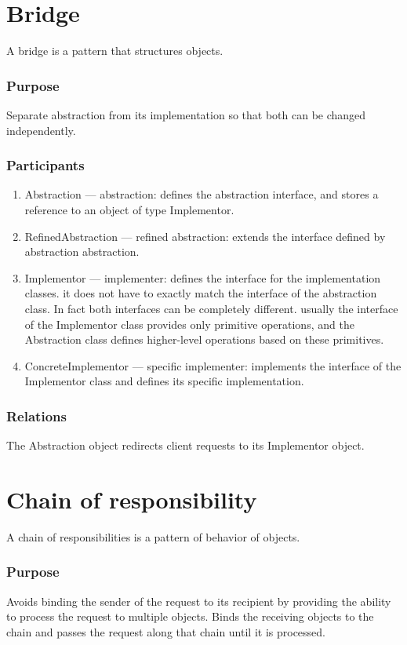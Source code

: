 \documentclass[12pt]{book}
\begin{document}
\section{Bridge}
A bridge is a pattern that structures objects.

\subsubsection{Purpose}
Separate abstraction from its implementation so that both can be changed independently.

\subsubsection{Participants}
\begin{enumerate}
    \item Abstraction — abstraction: defines the abstraction interface, and stores a reference to an object of type Implementor.
    \item RefinedAbstraction —  refined abstraction: extends the interface defined by abstraction abstraction.
    \item Implementor — implementer: defines the interface for the implementation classes. it does not have to exactly match the interface of the abstraction class. In fact both interfaces can be completely different. usually the interface of the Implementor class provides only primitive operations, and the  Abstraction class defines higher-level operations based on these primitives.
    \item ConcreteImplementor —  specific implementer: implements the interface of the Implementor class and defines its specific implementation.
\end{enumerate}

\subsubsection{Relations}
The Abstraction object redirects client requests to its  Implementor object.

\section{Chain of responsibility}
A chain of responsibilities is a pattern of behavior of objects.

\subsubsection{Purpose}
Avoids binding the sender of the request to its recipient by providing the ability to process the request to multiple objects. Binds the receiving objects to the chain and passes the request along that chain until it is processed.
\end{document}
